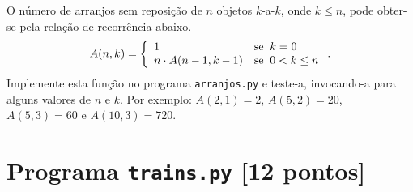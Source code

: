 \documentclass{article}
\renewcommand{\j}[1]{\texttt{#1}}
\begin{document}
O número de arranjos sem reposição de $n$ objetos $k$-a-$k$,
onde
$k \leq n$,
pode obter-se pela relação de recorrência abaixo.
\begin{equation}
A(n, k) = \left\{
    \begin{array}{l@{\hspace{2\arraycolsep}\mathrm{se}\;\;}l}
    1 &  k = 0 \\
    n \cdot A(n-1, k-1)  & 0 < k \leq n \\
    \end{array}
    \right..
\end{equation}
Implemente esta função no programa \j{arranjos.py}
e teste-a, invocando-a para alguns valores de $n$ e $k$.
Por exemplo: $A(2,1)=2$, $A(5,2)=20$, $A(5,3)=60$ e $A(10,3)=720$.


\section{Programa \j{trains.py} [12 pontos]}
\end{document}
